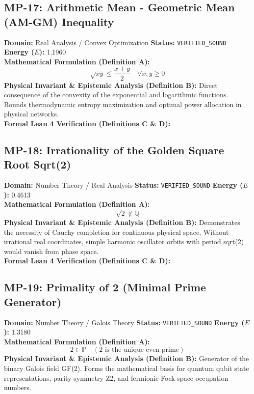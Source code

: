 \subsection{MP-17: Arithmetic Mean - Geometric Mean (AM-GM) Inequality}
\textbf{Domain:} Real Analysis / Convex Optimization \hfill \textbf{Status:} \texttt{VERIFIED\_SOUND} \hfill \textbf{Energy ($E$):} 1.1960\\
\textbf{Mathematical Formulation (Definition A):}
\begin{equation*}
\sqrt{x y} \le \frac{x + y}{2} \quad \forall x, y \ge 0
\end{equation*}
\textbf{Physical Invariant \& Epistemic Analysis (Definition B):}
Direct consequence of the convexity of the exponential and logarithmic functions. Bounds thermodynamic entropy maximization and optimal power allocation in physical networks.\\

\textbf{Formal Lean 4 Verification (Definitions C \& D):}


\vspace{1em}
\subsection{MP-18: Irrationality of the Golden Square Root Sqrt(2)}
\textbf{Domain:} Number Theory / Real Analysis \hfill \textbf{Status:} \texttt{VERIFIED\_SOUND} \hfill \textbf{Energy ($E$):} 0.4613\\
\textbf{Mathematical Formulation (Definition A):}
\begin{equation*}
\sqrt{2} \notin \mathbb{Q}
\end{equation*}
\textbf{Physical Invariant \& Epistemic Analysis (Definition B):}
Demonstrates the necessity of Cauchy completion for continuous physical space. Without irrational real coordinates, simple harmonic oscillator orbits with period sqrt(2) would vanish from phase space.\\

\textbf{Formal Lean 4 Verification (Definitions C \& D):}


\vspace{1em}
\subsection{MP-19: Primality of 2 (Minimal Prime Generator)}
\textbf{Domain:} Number Theory / Galois Theory \hfill \textbf{Status:} \texttt{VERIFIED\_SOUND} \hfill \textbf{Energy ($E$):} 1.3180\\
\textbf{Mathematical Formulation (Definition A):}
\begin{equation*}
2 \in \mathbb{P} \quad (2 \text{ is the unique even prime})
\end{equation*}
\textbf{Physical Invariant \& Epistemic Analysis (Definition B):}
Generator of the binary Galois field GF(2). Forms the mathematical basis for quantum qubit state representations, parity symmetry Z2, and fermionic Fock space occupation numbers.\\


